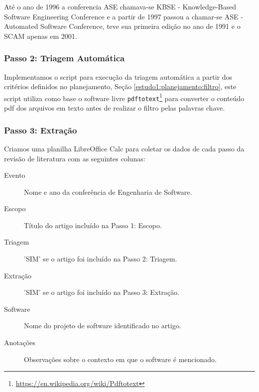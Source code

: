 Até o ano de 1996 a conferencia ASE chamava-se KBSE - Knowledge-Based Software
Engineering Conference e a partir de 1997 passou a chamar-se ASE - Automated
Software Conference, teve sua primeira edição no ano de 1991 e o SCAM apenas em
2001.

\subsubsection{Passo 2: Triagem Automática}



Implementamos o script para execução da triagem automática a partir dos
critérios definidos no planejamento, Seção \ref{estudo1:planejamento:filtro},
este script utiliza como base o software livre
\texttt{pdftotext}\footnote{\url{https://en.wikipedia.org/wiki/Pdftotext}} para
converter o conteúdo pdf dos arquivos em texto antes de realizar o filtro pelas
palavras chave.

\subsubsection{Passo 3: Extração}

Criamos uma planilha LibreOffice Calc para coletar os dados de cada passo da
revisão de literatura com as seguintes colunas:

\begin{description}
  \item[Evento] Nome e ano da conferência de Engenharia de Software.
  \item[Escopo] Título do artigo incluído na Passo 1: Escopo.
  \item[Triagem] 'SIM' se o artigo foi incluído na Passo 2: Triagem.
  \item[Extração] 'SIM' se o artigo foi incluído na Passo 3: Extração.
  \item[Software] Nome do projeto de software identificado no artigo.
  \item[Anotações] Observações sobre o contexto em que o software é mencionado.
\end{description}

